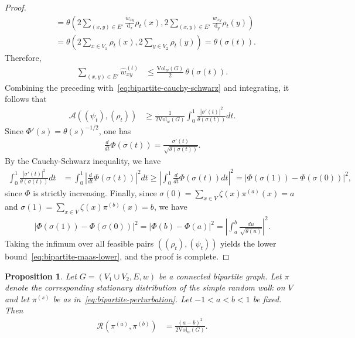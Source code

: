 \documentclass[11pt,a4paper]{article}
\newcommand{\Resis}{\mathcal{R}}
\newcommand{\Deg}{\mathrm{d}}
\newcommand{\Vol}{\mathrm{Vol}}
\newtheorem{proposition}[theorem]{Proposition}
\begin{document}
\begin{proof}
\begin{align*}
            &= \theta\left(  2\sum_{(x,y)\in E'} \frac{w_{xy}}{\Deg_x}\rho_t(x), 2\sum_{(x,y)\in E'} \frac{w_{xy}}{\Deg_y}\rho_t(y) \right)\\
            &= \theta\left( 2\sum_{x\in V_1} \rho_t(x), 2\sum_{y\in V_2} \rho_t(y) \right) = \theta(\sigma(t)).
        \end{align*}
    Therefore,
        \begin{align*}
            \sum_{(x,y)\in E'} \widehat{w}_{xy}^{(t)} &\leq \frac{\Vol_w(G)}{2}\,\theta(\sigma(t)).
        \end{align*}
    Combining the preceding with~\cref{eq:bipartite-cauchy-schwarz} and integrating, it follows that
        \begin{align*}
            \mathcal{A}((\psi_t),(\rho_t)) &\geq \frac{1}{2\Vol_w(G)} \int_0^1 \frac{|\sigma'(t)|^2}{\theta(\sigma(t))} dt.
        \end{align*}
    Since $\Phi'(s) = \theta(s)^{-1/2}$, one has
        \begin{align*}
            \frac{d}{dt}\Phi(\sigma(t)) = \frac{\sigma'(t)}{\sqrt{\theta(\sigma(t))}}. 
        \end{align*}
    By the Cauchy-Schwarz inequality, we have
        \begin{align*}
            \int_0^1 \frac{|\sigma'(t)|^2}{\theta(\sigma(t))} dt &= \int_0^1 \left|\frac{d}{dt}\Phi(\sigma(t))\right|^2 dt \geq \left|\int_0^1 \frac{d}{dt}\Phi(\sigma(t)) dt\right|^2 = |\Phi(\sigma(1)) - \Phi(\sigma(0))|^2,
        \end{align*}
    since $\Phi$ is strictly increasing. Finally, since $\sigma(0) = \sum_{x\in V} \zeta(x)\pi^{(a)}(x) = a$ and $\sigma(1) = \sum_{x\in V} \zeta(x)\pi^{(b)}(x) = b$, we have
        \begin{align*}
            |\Phi(\sigma(1)) - \Phi(\sigma(0))|^2 = |\Phi(b) - \Phi(a)|^2 = \left|\int_a^{b} \frac{du}{\sqrt{\theta(u)}}\right|^2.
        \end{align*}
    Taking the infimum over all feasible pairs $((\rho_t),(\psi_t))$ yields the lower bound~\cref{eq:bipartite-maas-lower}, and the proof is complete.
\end{proof}

\begin{proposition}\label{prop:bipartite-explicit-resis}
    Let $G=(V_1\cup V_2, E, w)$ be a connected bipartite graph. Let $\pi$ denote the corresponding stationary distribution of the simple random walk on $V$ and let $\pi^{(s)}$ be as in~\cref{eq:bipartite-perturbation}. Let $-1 < a < b < 1$ be fixed. Then
        \begin{align}\label{eq:bipartite-maas-resistance}
            \Resis(\pi^{(a)},\pi^{(b)}) &= \frac{(a-b)^2}{ 2\Vol_w(G)}.
        \end{align}
\end{proposition}
\end{document}
